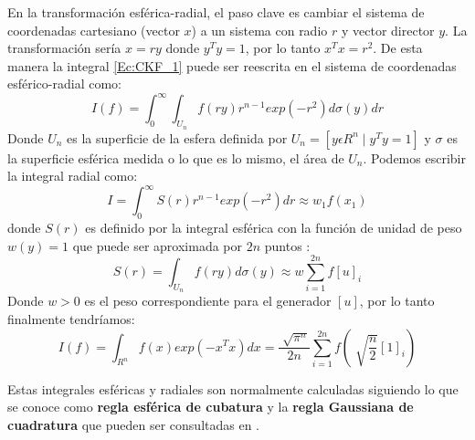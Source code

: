 En la transformación esférica-radial, el paso clave es cambiar el sistema de coordenadas cartesiano (vector $x$) a un sistema con radio $r$ y vector director $y$.
La transformación sería $x=ry$ donde $y^{T}y=1$, por lo tanto $x^{T}x=r^{2}$.
De esta manera la integral \ref{Ec:CKF_1} puede ser reescrita en el sistema de coordenadas esférico-radial como:
\begin{equation}\label{Ec:CKF_2}
I(f)=\int_{0}^{\infty}\int_{U_{n}}f(ry)r^{n-1}exp(-r^{2})d\sigma(y)dr 
\end{equation}
Donde $U_{n}$ es la superficie de la esfera definida por $U_{n}=[y \epsilon R^{n} \mid y^{T}y=1]$ y $\sigma$ es la superficie esférica medida o lo que es lo mismo, el área de $U_{n}$. 
Podemos escribir la integral radial como:
\begin{equation}\label{Ec:CKF_3}
I=\int_{0}^{\infty}S(r)r^{n-1}exp(-r^{2})dr \approx w_{1}f(x_{1})
\end{equation}
donde $S(r)$ es definido por la integral esférica con la función de unidad de peso $w(y)=1$ que puede ser aproximada por $2n$ puntos \cite{zhang_cubature_2013}:
\begin{equation}\label{Ec:CKF_4}
S(r)= \int_{U_{n}}f(ry)d\sigma(y) \approx w\sum_{i=1}^{2n}f[u]_{i}
\end{equation}
Donde $w>0$ es el peso correspondiente para el generador $[u]$, por lo tanto finalmente tendríamos:
\begin{equation}\label{Ec:CKF_5}
I(f)=\int_{R^{n}}f(x)exp(-x^{T}x)dx = \frac{\sqrt[]{\pi^{n}}}{2n}\sum_{i=1}^{2n}f(\sqrt[]{\frac{n}{2}}[1]_{i})
\end{equation}

Estas integrales esféricas y radiales son normalmente calculadas siguiendo lo que se conoce como \textbf{regla esférica de cubatura} y la \textbf{regla Gaussiana de cuadratura} que pueden ser consultadas en \cite{zhang_cubature_2013} \cite{ienkaran_cubature_2009} \cite{_cubature-based_2010}.

